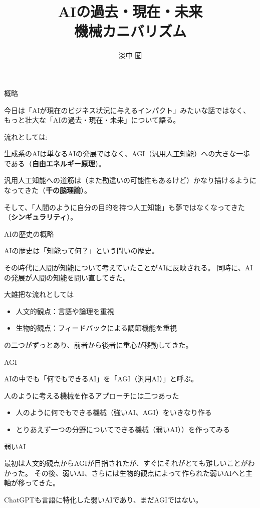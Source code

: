 \documentclass[12pt, unicode]{beamer}
\title{AIの過去・現在・未来 \\ 機械カニバリズム}
\author{淡中 圏}
\date{}
\begin{document}
\frame{\titlepage}

\begin{frame}{概略}

今日は「AIが現在のビジネス状況に与えるインパクト」みたいな話ではなく、もっと壮大な「AIの過去・現在・未来」について語る。

流れとしては:

生成系のAIは単なるAIの発展ではなく、AGI（汎用人工知能）への大きな一歩である（\textbf{自由エネルギー原理}）。

汎用人工知能への道筋は（また勘違いの可能性もあるけど）かなり描けるようになってきた（\textbf{千の脳理論}）。

そして、「人間のように自分の目的を持つ人工知能」も夢ではなくなってきた（\textbf{シンギュラリティ}）。

\end{frame}

\begin{frame}{AIの歴史の概略}

AIの歴史は「知能って何？」という問いの歴史。

その時代に人間が知能について考えていたことがAIに反映される。
同時に、AIの発展が人間の知能を問い直してきた。

大雑把な流れとしては

\begin{itemize}
\item 人文的観点：言語や論理を重視
\item 生物的観点：フィードバックによる調節機能を重視
\end{itemize}

の二つがずっとあり、前者から後者に重心が移動してきた。

\end{frame}

\begin{frame}{AGI}

AIの中でも「何でもできるAI」を「AGI（汎用AI）」と呼ぶ。

人のように考える機械を作るアプローチには二つあった

\begin{itemize}
\item 人のように何でもできる機械（強いAI、AGI）をいきなり作る
\item とりあえず一つの分野についてできる機械（弱いAI））を作ってみる
\end{itemize}

\end{frame}
\begin{frame}{弱いAI}

最初は人文的観点からAGIが目指されたが、すぐにそれがとても難しいことがわかった。
その後、弱いAI、さらには生物的観点によって作られた弱いAIへと主軸が移ってきた。

ChatGPTも言語に特化した弱いAIであり、まだAGIではない。

\end{frame}
\end{document}
